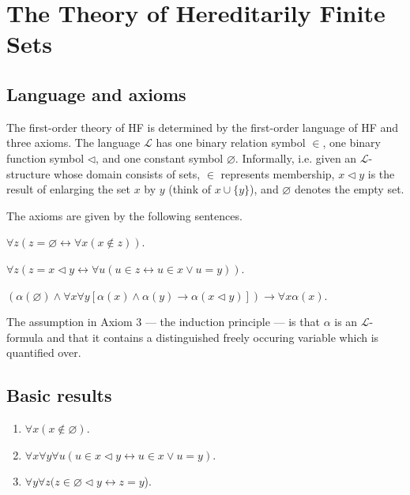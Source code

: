 \chapter{The Theory of Hereditarily Finite Sets}

\section{Language and axioms}

The first-order theory of HF is determined by the first-order language of HF and three axioms.
The language $\mathcal{L}$ has one binary relation symbol $\in$, one binary function symbol $\lhd$, and one constant symbol $\varnothing$.
Informally, i.e. given an $\mathcal{L}$-structure whose domain consists of sets,  $\in$ represents membership, $x \lhd y$ is the result of
enlarging the set $x$ by $y$ (think of $x \cup \{y\}$), and $\varnothing$ denotes the empty set.

The axioms are given by the following sentences.

\begin{axiom}
    \label{ax:empty_axiom}
    \leanok
    $\forall z (z=\varnothing \leftrightarrow \forall x(x \notin z))$.
\end {axiom}

\begin{axiom}
    \label{ax:enlarge_axiom}
    \leanok
    $\forall z (z=x \lhd y \leftrightarrow \forall u(u \in z \leftrightarrow u \in x \lor u=y))$.
\end {axiom}

\begin{axiom}
    \label{ax:induction_axiom}
    \leanok
    $(\alpha(\varnothing) \land \forall x \forall y[\alpha(x) \land \alpha(y) \rightarrow \alpha(x \lhd y)]) \rightarrow \forall x \alpha(x)$.
\end {axiom}

The assumption in Axiom 3 — the induction principle — is that $\alpha$ is an $\mathcal{L}$-formula
and that it contains a distinguished freely occuring variable which is quantified over.

\section{Basic results}

\begin{lemma}
    \label{lem:set_notin_empty+enlarge_iff+enlarge_empty}
    \leanok
    \leavevmode
    \begin{enumerate}
        \item $\forall x (x\notin \varnothing)$.
        \item $\forall x \forall y \forall u (u \in x \lhd y \leftrightarrow u \in x \lor u=y)$.
        \item $\forall y \forall z (z\in \varnothing \lhd y \leftrightarrow z = y$).
    \end{enumerate}
\end{lemma}

